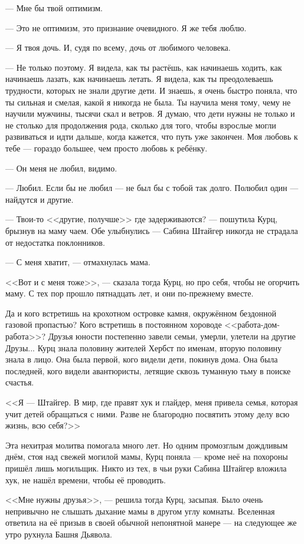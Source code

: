\documentclass[a4paper,10pt,fleqn]{book}\usepackage{polyglossia}\setdefaultlanguage{english}\setotherlanguage{russian}\defaultfontfeatures{Ligatures=TeX,Mapping=tex-text}\usepackage{xcolor}\definecolor{lightgray}{HTML}{bbbbbb}\color{lightgray}\newcommand{\ml}[3]{\textcolor{black}{#3}}
\begin{document}
--- Мне бы твой оптимизм.

--- Это не оптимизм, это признание очевидного.
Я же тебя люблю.

--- Я твоя дочь.
И, судя по всему, дочь от любимого человека.

--- Не только поэтому.
Я видела, как ты растёшь, как начинаешь ходить, как начинаешь лазать, как начинаешь летать.
Я видела, как ты преодолеваешь трудности, которых не знали другие дети.
И знаешь, я очень быстро поняла, что ты сильная и смелая, какой я никогда не была.
Ты научила меня тому, чему не научили мужчины, тысячи скал и ветров.
Я думаю, что дети нужны не только и не столько для продолжения рода, сколько для того, чтобы взрослые могли развиваться и идти дальше, когда кажется, что путь уже закончен.
Моя любовь к тебе --- гораздо большее, чем просто любовь к ребёнку.

--- Он меня не любил, видимо.

--- Любил.
Если бы не любил --- не был бы с тобой так долго.
Полюбил один --- найдутся и другие.

--- Твои-то <<другие, получше>> где задерживаются? --- пошутила Курц, брызнув на маму чаем.
Обе улыбнулись --- Сабина Штайгер никогда не страдала от недостатка поклонников.

--- С меня хватит, --- отмахнулась мама.

<<Вот и с меня тоже>>, --- сказала тогда Курц, но про себя, чтобы не огорчить маму.
С тех пор прошло пятнадцать лет, и они по-прежнему вместе.

Да и кого встретишь на крохотном островке камня, окружённом бездонной газовой пропастью?
Кого встретишь в постоянном хороводе <<работа-дом-работа>>?
Друзья юности постепенно завели семьи, умерли, улетели на другие Друзы...
Курц знала половину жителей Хербст по именам, вторую половину знала в лицо.
Она была первой, кого видели дети, покинув дома.
Она была последней, кого видели авантюристы, летящие сквозь туманную тьму в поиске счастья.

<<Я --- Штайгер.
В мир, где правят хук и глайдер, меня привела семья, которая учит детей обращаться с ними.
Разве не благородно посвятить этому делу всю жизнь, всю себя?>>

Эта нехитрая молитва помогала много лет.
Но одним промозглым дождливым днём, стоя над свежей могилой мамы, Курц поняла --- кроме неё на похороны пришёл лишь могильщик.
Никто из тех, в чьи руки Сабина Штайгер вложила хук, не нашёл времени, чтобы её проводить.

<<Мне нужны друзья>>, --- решила тогда Курц, засыпая.
Было очень непривычно не слышать дыхание мамы в другом углу комнаты.
Вселенная ответила на её призыв в своей обычной непонятной манере --- на следующее же утро рухнула Башня Дьявола.
\end{document}
